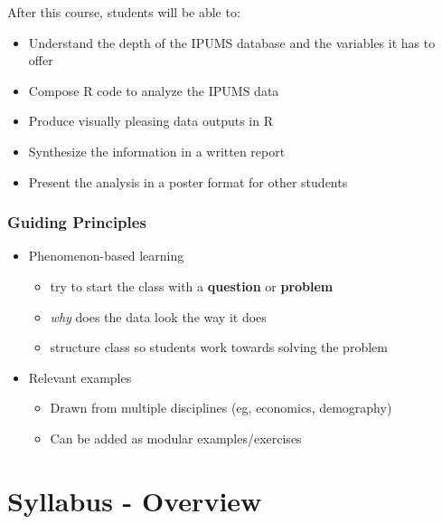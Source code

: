 \documentclass[
]{book}
\providecommand{\tightlist}{%
  \setlength{\itemsep}{0pt}\setlength{\parskip}{0pt}}
\begin{document}
After this course, students will be able to:

\begin{itemize}
\tightlist
\item
  Understand the depth of the IPUMS database and the variables it has to\\
  offer
\item
  Compose R code to analyze the IPUMS data
\item
  Produce visually pleasing data outputs in R
\item
  Synthesize the information in a written report
\item
  Present the analysis in a poster format for other students
\end{itemize}

\hypertarget{guiding-principles}{%
\subsection*{Guiding Principles}\label{guiding-principles}}

\begin{itemize}
\tightlist
\item
  Phenomenon-based learning

  \begin{itemize}
  \tightlist
  \item
    try to start the class with a \textbf{question} or \textbf{problem}
  \item
    \emph{why} does the data look the way it does
  \item
    structure class so students work towards solving the problem
  \end{itemize}
\item
  Relevant examples

  \begin{itemize}
  \tightlist
  \item
    Drawn from multiple disciplines (eg, economics, demography)
  \item
    Can be added as modular examples/exercises
  \end{itemize}
\end{itemize}

\hypertarget{syllabus---overview}{%
\chapter*{Syllabus - Overview}\label{syllabus---overview}}
\end{document}
